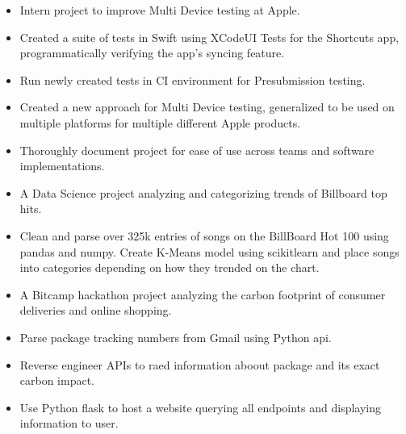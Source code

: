 \documentclass[11pt]{article}
\begin{document}
\vspace{2mm}
{\fontsize{10}{12}\robotocondlight
\begin{itemize}[noitemsep,nolistsep]
    \item Intern project to improve Multi Device testing at Apple. 
    \item Created a suite of tests in {\robotocond Swift} using {\robotocond XCodeUI Tests} for the Shortcuts app, programmatically verifying the app's syncing feature.
    \item Run newly created tests in CI environment for Presubmission testing.
    \item Created a new approach for Multi Device testing, generalized to be used on multiple platforms for multiple different Apple products. 
    \item Thoroughly document project for ease of use across teams and software implementations.
\end{itemize}
\begin{itemize}[noitemsep,nolistsep]
    \item A Data Science project analyzing and categorizing trends of Billboard top hits. 
    \item Clean and parse over 325k entries of songs on the BillBoard Hot 100 using {\robotocond pandas} and {\robotocond numpy}.
    Create K-Means model using {\robotocond scikitlearn} and place songs into categories depending on how they trended on the chart. 
\end{itemize}
\begin{itemize}[noitemsep,nolistsep]
    \item A Bitcamp hackathon project analyzing the carbon footprint of consumer deliveries and online shopping. 
    \item Parse package tracking numbers from Gmail using {\robotocond Python} api. 
    \item Reverse engineer APIs to raed information aboout package and its exact carbon impact. 
    \item Use {\robotocond Python flask} to host a website querying all endpoints and displaying information to user.
\end{itemize}
}
\end{document}
